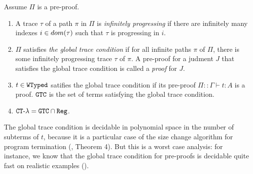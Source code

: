 \begin{definition}\label{definition-global-trace-condition}
Assume $\Pi$ is a pre-proof.
\begin{enumerate}
\item
A trace $\tau$ of a path $\pi$ in $\Pi$ is \emph{infinitely progressing} 
if there are infinitely many indexes $i \in {{\relax dom}}(\tau)$ such that $\tau$ is progressing in $i$.

\item
$\Pi$ satisfies \emph{the global trace condition} if 
for all infinite paths $\pi$ of $\Pi$,
there is some infinitely progressing trace $\tau$ of $\pi$.
A pre-proof for a judment $J$ that satisfies the global trace condition is called a \emph{proof} for $J$.

\item
$t \in {\tt WTyped}$ satifies the global trace condition if
its pre-proof $\Pi::\Gamma \vdash t :A$ is a proof.
${\tt GTC}$ is the set of terms satisfying the global trace condition.

\item
  ${ {\tt CT}\mbox{-}\lambda} = {\tt GTC} \cap {\tt Reg}$. 
\end{enumerate}
\end{definition}

The global trace condition is decidable in polynomial space in the number of
subterms of $t$, %
because it is a particular case of the size change algorithm for program 
termination (\cite{SCT}, Theorem 4). 
But this is a worst case analysis: for instance, 
we know that the global trace condition for pre-proofs is decidable quite fast on realistic examples
(\cite{10.1007/978-3-642-35182-2_25, 10.1145/3018610.3018623, 10.1145/3632888, 10.1007/978-3-031-90643-5_18, 10.1145/3453483.3454087, Brotherston2020, Stratulat_2021}). 

